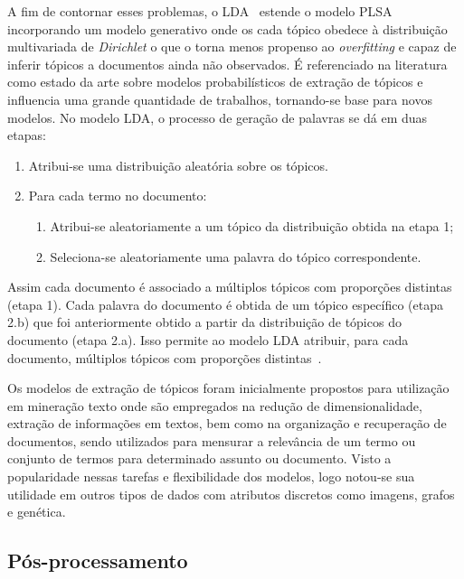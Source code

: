 A fim de contornar esses problemas, o LDA~\cite{Blei2003} estende o modelo PLSA incorporando um modelo generativo onde os cada tópico obedece à distribuição multivariada de \textit{Dirichlet} o que o torna menos propenso ao \textit{overfitting} e capaz de inferir tópicos a documentos ainda não observados. É referenciado na literatura como estado da arte sobre modelos probabilísticos de extração de tópicos e influencia uma grande quantidade de trabalhos, tornando-se base para novos modelos. No modelo LDA, o processo de geração de palavras se dá em duas etapas:

\begin{enumerate}
	\item Atribui-se uma distribuição aleatória sobre os tópicos.
	\item Para cada termo no documento:
		\begin{enumerate}
			\item Atribui-se aleatoriamente a um tópico da distribuição obtida na etapa 1;
			\item Seleciona-se aleatoriamente uma palavra do tópico correspondente.
		\end{enumerate}
\end{enumerate}

Assim cada documento é associado a múltiplos tópicos com proporções distintas (etapa 1). Cada palavra do documento é obtida de um tópico específico (etapa 2.b) que foi anteriormente obtido a partir da distribuição de tópicos do documento (etapa 2.a). Isso permite ao modelo LDA atribuir, para cada documento, múltiplos tópicos com proporções distintas~\cite{Blei2012}.

Os modelos de extração de tópicos foram inicialmente propostos para utilização em mineração texto onde são empregados na redução de dimensionalidade, extração de informações em textos, bem como na organização e recuperação de documentos, sendo utilizados para mensurar a relevância de um termo ou conjunto de termos para determinado assunto ou documento. Visto a popularidade nessas tarefas e flexibilidade dos modelos, logo notou-se sua utilidade em outros tipos de dados com atributos discretos como imagens, grafos e genética. 


\subsection{Pós-processamento}
